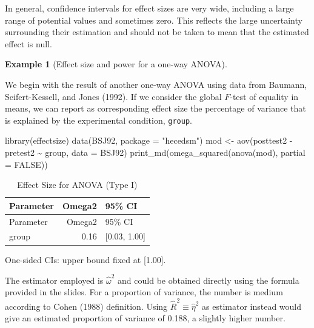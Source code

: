\documentclass[
  11pt,
  letterpaper,
]{scrbook}
\newenvironment{Shaded}{\begin{snugshade}}{\end{snugshade}}
\newcommand{\AttributeTok}[1]{\textcolor[rgb]{0.40,0.45,0.13}{#1}}
\newcommand{\ConstantTok}[1]{\textcolor[rgb]{0.56,0.35,0.01}{#1}}
\newcommand{\FunctionTok}[1]{\textcolor[rgb]{0.28,0.35,0.67}{#1}}
\newcommand{\NormalTok}[1]{\textcolor[rgb]{0.00,0.23,0.31}{#1}}
\newcommand{\OtherTok}[1]{\textcolor[rgb]{0.00,0.23,0.31}{#1}}
\newcommand{\SpecialCharTok}[1]{\textcolor[rgb]{0.37,0.37,0.37}{#1}}
\newcommand{\StringTok}[1]{\textcolor[rgb]{0.13,0.47,0.30}{#1}}
\theoremstyle{definition}
\theoremstyle{definition}
\newtheorem{example}{Example}[chapter]
\theoremstyle{remark}
\begin{document}
In general, confidence intervals for effect sizes are very wide,
including a large range of potential values and sometimes zero. This
reflects the large uncertainty surrounding their estimation and should
not be taken to mean that the estimated effect is null.

\begin{example}[Effect size and power for a one-way
ANOVA]\protect\hypertarget{exm-power1}{}\label{exm-power1}

We begin with the result of another one-way ANOVA using data from
Baumann, Seifert-Kessell, and Jones (1992). If we consider the global
\(F\)-test of equality in means, we can report as corresponding effect
size the percentage of variance that is explained by the experimental
condition, \texttt{group}.

\begin{Shaded}
\begin{Highlighting}[]
\FunctionTok{library}\NormalTok{(effectsize)}
\FunctionTok{data}\NormalTok{(BSJ92, }\AttributeTok{package =} \StringTok{"hecedsm"}\NormalTok{)}
\NormalTok{mod }\OtherTok{\textless{}{-}} \FunctionTok{aov}\NormalTok{(posttest2 }\SpecialCharTok{{-}}\NormalTok{ pretest2 }\SpecialCharTok{\textasciitilde{}}\NormalTok{ group,}
           \AttributeTok{data =}\NormalTok{ BSJ92)}
\FunctionTok{print\_md}\NormalTok{(}\FunctionTok{omega\_squared}\NormalTok{(}\FunctionTok{anova}\NormalTok{(mod), }\AttributeTok{partial =} \ConstantTok{FALSE}\NormalTok{))}
\end{Highlighting}
\end{Shaded}

\begin{longtable}[]{@{}lrl@{}}
\caption{Effect Size for ANOVA (Type I)}\tabularnewline
\toprule\noalign{}
Parameter & Omega2 & 95\% CI \\
\midrule\noalign{}
\endfirsthead
\toprule\noalign{}
Parameter & Omega2 & 95\% CI \\
\midrule\noalign{}
\endhead
\bottomrule\noalign{}
\endlastfoot
group & 0.16 & {[}0.03, 1.00{]} \\
\end{longtable}

One-sided CIs: upper bound fixed at {[}1.00{]}.

The estimator employed is \(\widehat{\omega}^2\) and could be obtained
directly using the formula provided in the slides. For a proportion of
variance, the number is medium according to Cohen (1988) definition.
Using \(\widehat{R}^2 \equiv \widehat{\eta}^2\) as estimator instead
would give an estimated proportion of variance of 0.188, a slightly
higher number.


\end{example}
\end{document}

